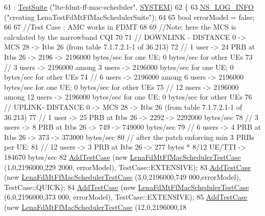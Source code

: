 \begin{DoxyCode}
61   : \hyperlink{classns3_1_1TestSuite_a904b0c40583b744d30908aeb94636d1a}{TestSuite} (\textcolor{stringliteral}{"lte-fdmt-ff-mac-scheduler"}, \hyperlink{classns3_1_1TestSuite_a1ebfcab34ec8161e085e8e3a1855eae0a90c5529a26ab3a5ffcc6e57040dbd82e}{SYSTEM})
62 \{
63   \hyperlink{group__logging_gafbd73ee2cf9f26b319f49086d8e860fb}{NS\_LOG\_INFO} (\textcolor{stringliteral}{"creating LenaTestFdMtFfMacSchedulerSuite"});
64 
65   \textcolor{keywordtype}{bool} errorModel = \textcolor{keyword}{false};
66 
67   \textcolor{comment}{//Test Case : AMC works in FDMT}
68 
69   \textcolor{comment}{//Note: here the MCS is calculated by the narrowband CQI}
70 
71   \textcolor{comment}{// DOWNLINK - DISTANCE 0 -> MCS 28 -> Itbs 26 (from table 7.1.7.2.1-1 of 36.213)}
72   \textcolor{comment}{// 1 user -> 24 PRB at Itbs 26 -> 2196 -> 2196000 bytes/sec for one UE; 0 bytes/sec for other UEs}
73   \textcolor{comment}{// 3 users -> 2196000 among 3 users -> 2196000 bytes/sec for one UE; 0 bytes/sec for other UEs}
74   \textcolor{comment}{// 6 users -> 2196000 among 6 users -> 2196000 bytes/sec for one UE; 0 bytes/sec for other UEs}
75   \textcolor{comment}{// 12 users -> 2196000 among 12 users -> 2196000 bytes/sec for one UE; 0 bytes/sec for other UEs}
76   \textcolor{comment}{// UPLINK- DISTANCE 0 -> MCS 28 -> Itbs 26 (from table 7.1.7.2.1-1 of 36.213)}
77   \textcolor{comment}{// 1 user -> 25 PRB at Itbs 26 -> 2292 -> 2292000 bytes/sec}
78   \textcolor{comment}{// 3 users -> 8 PRB at Itbs 26 -> 749 -> 749000 bytes/sec}
79   \textcolor{comment}{// 6 users -> 4 PRB at Itbs 26 -> 373 -> 373000 bytes/sec}
80   \textcolor{comment}{// after the patch enforcing min 3 PRBs per UE:}
81   \textcolor{comment}{// 12 users -> 3 PRB at Itbs 26 -> 277 bytes * 8/12 UE/TTI -> 184670 bytes/sec}
82   \hyperlink{classns3_1_1TestCase_a3718088e3eefd5d6454569d2e0ddd835}{AddTestCase} (\textcolor{keyword}{new} \hyperlink{classLenaFdMtFfMacSchedulerTestCase}{LenaFdMtFfMacSchedulerTestCase} (1,0,2196000,229
      2000, errorModel), TestCase::EXTENSIVE);
83   \hyperlink{classns3_1_1TestCase_a3718088e3eefd5d6454569d2e0ddd835}{AddTestCase} (\textcolor{keyword}{new} \hyperlink{classLenaFdMtFfMacSchedulerTestCase}{LenaFdMtFfMacSchedulerTestCase} (3,0,2196000,749
      000,errorModel), TestCase::QUICK);
84   \hyperlink{classns3_1_1TestCase_a3718088e3eefd5d6454569d2e0ddd835}{AddTestCase} (\textcolor{keyword}{new} \hyperlink{classLenaFdMtFfMacSchedulerTestCase}{LenaFdMtFfMacSchedulerTestCase} (6,0,2196000,373
      000, errorModel), TestCase::EXTENSIVE);
85   \hyperlink{classns3_1_1TestCase_a3718088e3eefd5d6454569d2e0ddd835}{AddTestCase} (\textcolor{keyword}{new} \hyperlink{classLenaFdMtFfMacSchedulerTestCase}{LenaFdMtFfMacSchedulerTestCase} (12,0,2196000,18

\end{DoxyCode}
